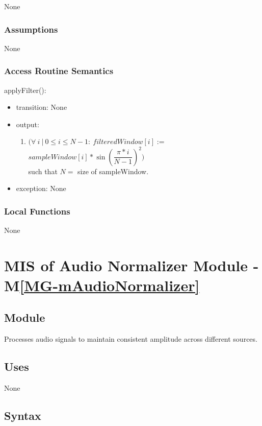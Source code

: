 \documentclass[12pt, titlepage]{article}
\newcommand{\mref}[1]{M\ref{#1}}
\begin{document}
None

\subsubsection{Assumptions}

None

\subsubsection{Access Routine Semantics}

\noindent applyFilter():
\begin{itemize}
\item transition: None
\item output:
  \begin{enumerate}
    \item $(\forall~i~|~0 \leq i \leq N - 1:~filteredWindow[i] := $
    $sampleWindow[i] * \sin(\dfrac{\pi * i}{N - 1})^2)$ \\
    such that $N = $ size of sampleWindow.
  \end{enumerate}
\item exception: None
\end{itemize}


\subsubsection{Local Functions}

None


\newpage

\section{MIS of Audio Normalizer Module \label{mod:AudioNormalizer} -
  \mref{MG-mAudioNormalizer}}

\subsection{Module}

Processes audio signals to maintain consistent amplitude across different
sources.

\subsection{Uses}

None

\subsection{Syntax}
\end{document}
